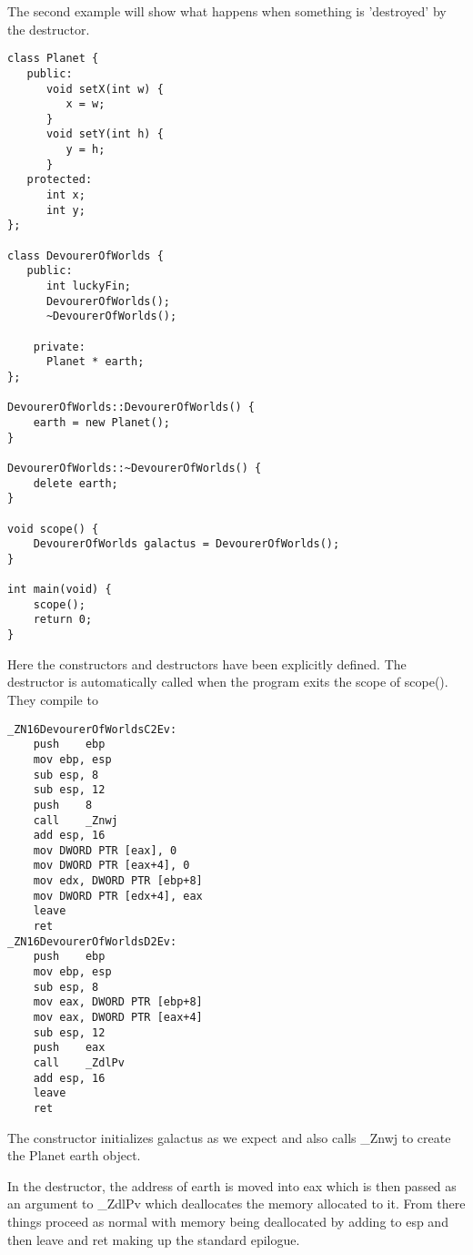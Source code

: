 \documentclass{article}
\begin{document}
The second example will show what happens when something is 'destroyed' by the destructor.
\begin{lstlisting}
class Planet {
   public:
      void setX(int w) {
         x = w;
      }
      void setY(int h) {
         y = h;
      }
   protected:
      int x;
      int y;
};

class DevourerOfWorlds {
   public:
      int luckyFin;
      DevourerOfWorlds();
      ~DevourerOfWorlds();

    private:
      Planet * earth;
};

DevourerOfWorlds::DevourerOfWorlds() {
    earth = new Planet();
}

DevourerOfWorlds::~DevourerOfWorlds() {
    delete earth;
}

void scope() {
    DevourerOfWorlds galactus = DevourerOfWorlds();
}

int main(void) {
    scope();
    return 0;
}

\end{lstlisting}
Here the constructors and destructors have been explicitly defined. The destructor is automatically called when the program exits the scope of scope(). They compile to
\begin{lstlisting}
_ZN16DevourerOfWorldsC2Ev:
	push	ebp
	mov	ebp, esp
	sub	esp, 8
	sub	esp, 12
	push	8
	call	_Znwj
	add	esp, 16
	mov	DWORD PTR [eax], 0
	mov	DWORD PTR [eax+4], 0
	mov	edx, DWORD PTR [ebp+8]
	mov	DWORD PTR [edx+4], eax
	leave
	ret
_ZN16DevourerOfWorldsD2Ev:
	push	ebp
	mov	ebp, esp
	sub	esp, 8
	mov	eax, DWORD PTR [ebp+8]
	mov	eax, DWORD PTR [eax+4]
	sub	esp, 12
	push	eax
	call	_ZdlPv
	add	esp, 16
	leave
	ret
\end{lstlisting}
The constructor initializes galactus as we expect and also calls \_Znwj to create the Planet earth object. 

In the destructor, the address of earth is moved into eax which is then passed as an argument to \_ZdlPv which deallocates the memory allocated to it. From there things proceed as normal with memory being deallocated by adding to esp and then leave and ret making up the standard epilogue.
\end{document}
